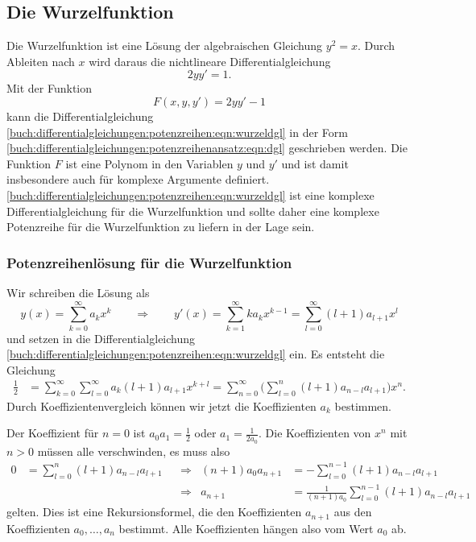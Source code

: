 %
%
%
\subsection{Die Wurzelfunktion}
Die Wurzelfunktion ist eine Lösung der algebraischen Gleichung $y^2=x$.
Durch Ableiten nach $x$ wird daraus die nichtlineare Differentialgleichung
\begin{equation}
2yy'=1.
\label{buch:differentialgleichungen:potenzreihen:eqn:wurzeldgl}
\end{equation}
Mit der Funktion
\[
F(x,y,y')
=
2yy'-1
\]
kann die Differentialgleichung
\eqref{buch:differentialgleichungen:potenzreihen:eqn:wurzeldgl}
in der Form
\eqref{buch:differentialgleichungen:potenzreihenansatz:eqn:dgl}
geschrieben werden.
Die Funktion $F$ ist eine Polynom in den Variablen $y$ und $y'$ und
ist damit insbesondere auch für komplexe Argumente definiert.
\eqref{buch:differentialgleichungen:potenzreihen:eqn:wurzeldgl}
ist eine komplexe Differentialgleichung für die Wurzelfunktion
und sollte daher eine komplexe Potenzreihe für die Wurzelfunktion
zu liefern in der Lage sein.

%
%
\subsubsection{Potenzreihenlösung für die Wurzelfunktion}
Wir schreiben die Lösung als
\[
y(x)
=
\sum_{k=0}^\infty a_kx^k
\qquad\Rightarrow\qquad
y'(x)
=
\sum_{k=1}^\infty ka_kx^{k-1}
=
\sum_{l=0}^\infty (l+1)a_{l+1}x^l
\]
und setzen in die Differentialgleichung
\eqref{buch:differentialgleichungen:potenzreihen:eqn:wurzeldgl}
ein.
Es entsteht die Gleichung
\begin{align}
\frac12
&=
\sum_{k=0}^\infty \sum_{l=0}^\infty a_k(l+1)a_{l+1}x^{k+l}
=
\sum_{n=0}^\infty
\biggl(
\sum_{l=0}^n (l+1)a_{n-l}a_{l+1}
\biggr)
x^n.
\end{align}
Durch Koeffizientenvergleich können wir jetzt die Koeffizienten $a_k$
bestimmen.


Der Koeffizient für $n=0$ ist $a_0a_1=\frac12$ oder $a_1=\frac{1}{2a_0}$.
Die Koeffizienten von $x^n$ mit $n>0$ müssen alle verschwinden, es muss
also
\begin{align*}
0
&=
\sum_{l=0}^n (l+1)a_{n-l}a_{l+1}
&&\Rightarrow&
(n+1)a_0a_{n+1}
&=
-
\sum_{l=0}^{n-1} (l+1)a_{n-l}a_{l+1}
\\
&
&&\Rightarrow&
a_{n+1}
&=
\frac{1}{(n+1)a_0}
\sum_{l=0}^{n-1} (l+1)a_{n-l}a_{l+1}
\end{align*}
gelten.
Dies ist eine Rekursionsformel, die den Koeffizienten $a_{n+1}$ aus
den Koeffizienten $a_0,\dots,a_n$ bestimmt.
Alle Koeffizienten hängen also vom Wert $a_0$ ab.

